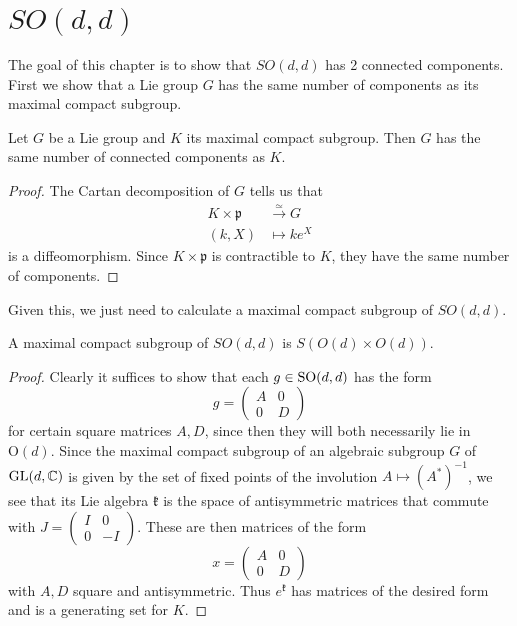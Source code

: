 \documentclass{report}
\begin{document}
\chapter{$SO(d,d)$}
The goal of this chapter is to show that $SO(d,d)$ has 2 connected components.
First we show that a Lie group $G$ has the same number of components as its maximal compact subgroup.
\begin{proposition}
    Let $G$ be a Lie group and $K$ its maximal compact subgroup.
    Then $G$ has the same number of connected components as $K$.
\end{proposition}
\begin{proof}
    The Cartan decomposition of $G$ tells us that 
    \begin{align*}
        K \times \mathfrak p &\overset{\simeq}{\to} G\\
        (k, X) &\mapsto k e^X
    \end{align*}
    is a diffeomorphism.
    Since $K \times \mathfrak p$ is contractible to $K$, they have the same number of components.
\end{proof}
Given this, we just need to calculate a maximal compact subgroup of $SO(d,d)$.
\begin{proposition}
    A maximal compact subgroup of $SO(d,d)$ is $S(O(d) \times O(d))$.
\end{proposition}
\begin{proof}
    Clearly it suffices to show that each $g \in \operatorname{{\mathrm{SO}}}(d,d)$ has the form
    \[
    g = \begin{pmatrix} A & 0 \\ 0 & D \end{pmatrix}
    \]
    for certain square matrices $A, D$, since then they will both necessarily lie in $\mathrm{O}(d)$.
    Since the maximal compact subgroup of an algebraic subgroup $G$ of $\operatorname{{\mathrm{GL}}}(d, \mathbb C)$ is given by the set of fixed points of the involution $A \mapsto (A^*)^{-1}$, we see that its Lie algebra $\mathfrak k$ is the space of antisymmetric matrices that commute with $J = \begin{pmatrix} I & 0 \\ 0 & -I \end{pmatrix}$.
    These are then matrices of the form 
    \[
    x = \begin{pmatrix} A & 0 \\ 0 & D \end{pmatrix}
    \]
    with $A, D$ square and antisymmetric.
    Thus $e^{\mathfrak k}$ has matrices of the desired form and is a generating set for $K$.
\end{proof}


\printbibliography
\end{document}
